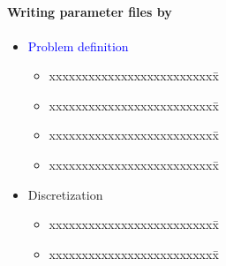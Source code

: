 \NEWSEC

\subsection{\ssParameters}

\begin{frame}[fragile,label=ss-parameters] 
\secframetitle{\ssParameters}
\framesubtitle{Writing parameter files by }
\vspace{-0.2in}
\begin{minipage}[t]{1.7in}
\begin{itemize}
\item 
\textcolor{blue}{Problem definition}
  \begin{itemize}
\pause
\item
\begin{tabbing}
xxxxxxxxxxxxxxxxxxxxxxxxxx\=\kill
  \textcolor{blue}{} \> 
\end{tabbing}
\item \begin{tabbing}
xxxxxxxxxxxxxxxxxxxxxxxxxx\=\kill
  \textcolor{blue}{} \> 
\end{tabbing}
\item \begin{tabbing}
xxxxxxxxxxxxxxxxxxxxxxxxxx\=\kill
  \textcolor{blue}{} \> 
\end{tabbing}
\pause
  \item \begin{tabbing}
xxxxxxxxxxxxxxxxxxxxxxxxxx\=\kill
 \textcolor{blue}{} \> 
\end{tabbing}
  \end{itemize}
\pause
\item \textcolor{green!50!black}{Discretization}
  \begin{itemize}
  \item \begin{tabbing}
xxxxxxxxxxxxxxxxxxxxxxxxxx\=\kill
 \textcolor{green!50!black}{} \> 
  \end{tabbing}  
  \item \begin{tabbing}
xxxxxxxxxxxxxxxxxxxxxxxxxx\=\kill
 \textcolor{green!50!black}{} \> 

\end{tabbing}
\end{itemize}
\end{itemize}
\end{minipage}
\end{frame}
